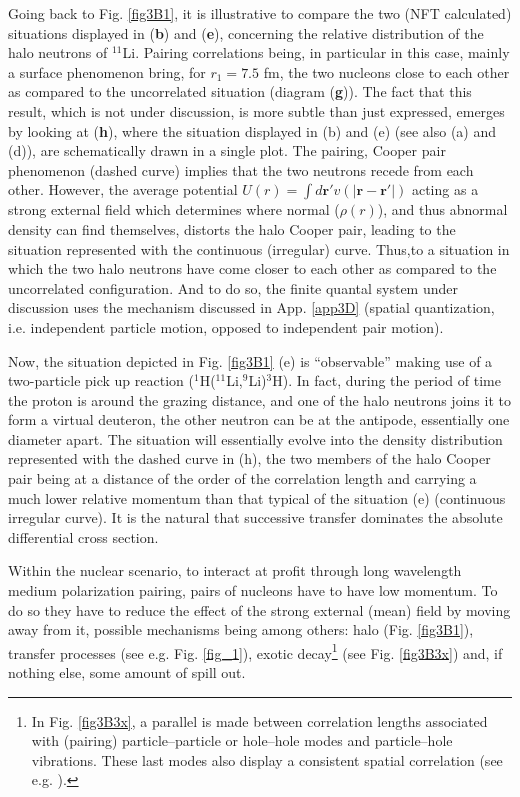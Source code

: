 \begin{subappendices}
Going back to Fig. \ref{fig3B1}, it is illustrative to compare the two (NFT calculated) situations displayed in (\textbf{b}) and (\textbf{e}), concerning the relative distribution of the halo neutrons of $^{11}$Li. Pairing correlations being, in particular in this case, mainly a surface phenomenon bring, for $r_1=7.5$ fm, the two nucleons close to each other as compared to the uncorrelated situation (diagram (\textbf{g})). The fact that this result, which is not under discussion, is more subtle than just expressed, emerges by looking at (\textbf{h}), where the situation displayed in (b) and (e) (see also (a) and (d)), are schematically drawn in a single plot.
The pairing, Cooper pair phenomenon (dashed curve) implies that the two neutrons recede from each other. However, the average potential $U(r)=\int  d\mathbf r' v(|\mathbf r-\mathbf r'|)$ acting as a strong external field which determines where normal ($\rho(r)$), and thus abnormal density can find themselves, distorts the halo Cooper pair, leading to the situation represented with the continuous (irregular) curve. Thus,to a situation in which the two halo neutrons have come closer to each other as compared to the uncorrelated configuration. And to do so, the finite quantal system under discussion uses the mechanism discussed in App. \ref{app3D} (spatial quantization, i.e. independent particle motion, opposed to independent pair motion).


Now, the situation depicted in Fig. \ref{fig3B1} (e) is ``observable'' making use of a two-particle pick up reaction ($^1$H($^{11}$Li,$^9$Li)$^3$H). In fact, during the period of time the proton is around the grazing distance, and one of the halo neutrons joins it to form a virtual deuteron, the other neutron can be at the antipode, essentially one diameter apart. The situation will essentially evolve into the density distribution represented with the dashed curve in (h), the two members of the halo Cooper pair being at a distance of the order of the correlation length and carrying a much lower relative momentum than that typical of the situation (e) (continuous irregular curve). It is the natural that successive transfer dominates the absolute differential cross section.

 Within the nuclear scenario, to interact at profit through long wavelength medium polarization pairing, pairs of nucleons have to have low momentum. To do so they have to reduce the effect of the strong external (mean) field by moving away from it, possible mechanisms being among others: halo (Fig. \ref{fig3B1}), transfer processes (see e.g. Fig. \ref{fig_1}), exotic decay\footnote{In Fig. \ref{fig3B3x}, a parallel is made between correlation lengths associated with (pairing) particle--particle or hole--hole modes and particle--hole vibrations. These last modes  also display a consistent spatial correlation (see e.g. \cite{Broglia:71}).} (see Fig. \ref{fig3B3x}) and, if nothing else, some amount of spill out.

\end{subappendices}
